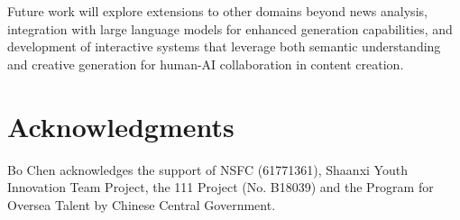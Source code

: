 \documentclass{article}
\begin{document}
Future work will explore extensions to other domains beyond news analysis, integration with large language models for enhanced generation capabilities, and development of interactive systems that leverage both semantic understanding and creative generation for human-AI collaboration in content creation. \vspace{-2mm}
\section*{Acknowledgments} \vspace{-2mm}
Bo Chen acknowledges the support of NSFC (61771361), Shaanxi Youth Innovation Team Project, the 111 Project (No. B18039) and  the Program for Oversea Talent by Chinese Central Government. 
\end{document}
